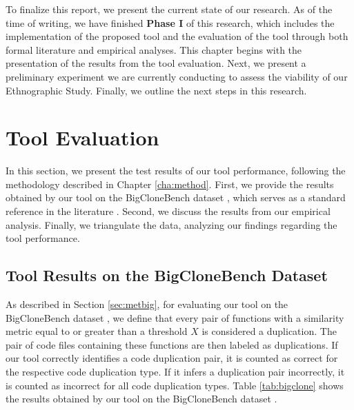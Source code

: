 \en 


To finalize this report, we present the current state of our research. As of the 
time of writing, we have finished \textbf{Phase I} of this research, 
which includes the implementation of 
the proposed tool and the evaluation of the tool through both formal literature 
and empirical analyses. This chapter begins with the presentation of the results 
from the tool evaluation. Next, we present a preliminary experiment we are currently 
conducting to assess the viability of our Ethnographic Study. Finally, we outline 
the next steps in this research.

\section{Tool Evaluation}
\label{sec:eval}

In this section, we present the test results of our tool performance, following the methodology described in Chapter \ref{cha:method}. First, we provide the results obtained by our tool on the BigCloneBench dataset \citep{bigclonebench}, which serves as a standard reference in the literature \citep{litreview}. Second, we discuss the results from our empirical analysis. Finally, we triangulate the data, analyzing our findings regarding the tool performance.

\subsection{Tool Results on the BigCloneBench Dataset}



As described in Section \ref{sec:metbig}, for evaluating our tool on the BigCloneBench dataset \citep{bigclonebench}, we define that every pair of functions with a similarity metric equal to or greater than a threshold \( X \) is considered a duplication. The pair of code files containing these functions are then labeled as duplications. If our tool correctly identifies a code duplication pair, it is counted as correct for the respective code duplication type. If it infers a duplication pair incorrectly, it is counted as incorrect for all code duplication types. Table \ref{tab:bigclone} shows the results obtained by our tool on the BigCloneBench dataset \citep{bigclonebench}.

